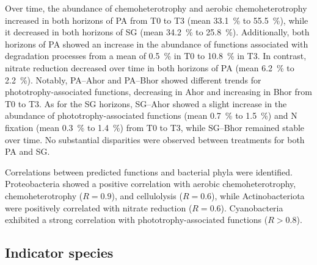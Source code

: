 Over time, the abundance of chemoheterotrophy and aerobic chemoheterotrophy increased in both horizons of PA from T0 to T3 (mean \SI{33.1}{\percent} to \SI{55.5}{\percent}), while it decreased in both horizons of SG (mean \SI{34.2}{\percent} to \SI{25.8}{\percent}). Additionally, both horizons of PA showed an increase in the abundance of functions associated with degradation processes from a mean of \SI{0.5}{\percent} in T0 to \SI{10.8}{\percent} in T3. In contrast, nitrate reduction decreased over time in both horizons of PA (mean \SI{6.2}{\percent} to \SI{2.2}{\percent}). Notably, PA--Ahor and PA--Bhor showed different trends for phototrophy-associated functions, decreasing in Ahor and increasing in Bhor from T0 to T3. As for the SG horizons, SG--Ahor showed a slight increase in the abundance of phototrophy-associated functions (mean \SI{0.7}{\percent} to \SI{1.5}{\percent}) and N fixation (mean \SI{0.3}{\percent} to \SI{1.4}{\percent}) from T0 to T3, while SG--Bhor remained stable over time. No substantial disparities were observed between treatments for both PA and SG.

Correlations between predicted functions and bacterial phyla were identified. Proteobacteria showed a positive correlation with aerobic chemoheterotrophy, chemoheterotrophy (\(R=0.9\)), and cellulolysis (\(R=0.6\)), while Actinobacteriota were positively correlated with nitrate reduction (\(R=0.6\)). Cyanobacteria exhibited a strong correlation with phototrophy-associated functions (\(R > 0.8\)).

\subsection{Indicator species}

